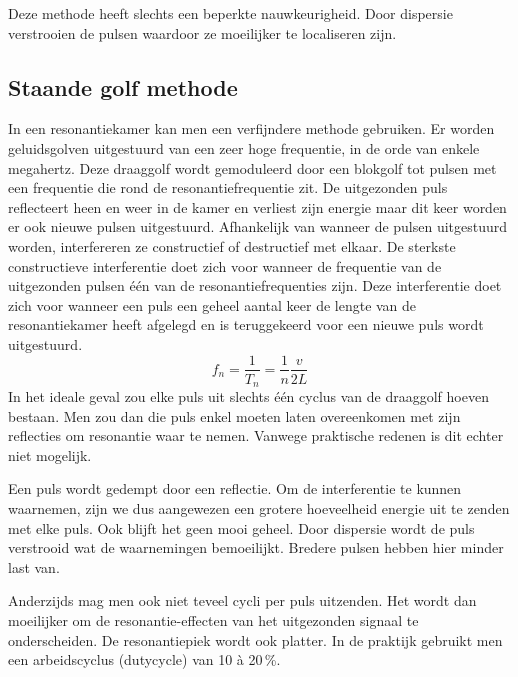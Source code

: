 
Deze methode heeft slechts een beperkte nauwkeurigheid. Door dispersie 
verstrooien de pulsen waardoor ze moeilijker te localiseren zijn.

\subsection{Staande golf methode}

In een resonantiekamer kan men een verfijndere methode gebruiken. Er worden 
geluidsgolven uitgestuurd van een zeer hoge frequentie, in de orde van enkele 
megahertz. Deze draaggolf wordt gemoduleerd door een blokgolf tot pulsen met 
een frequentie die rond de resonantiefrequentie zit. De uitgezonden puls 
reflecteert heen en weer in de kamer en verliest zijn energie maar dit keer 
worden er ook nieuwe pulsen uitgestuurd. Afhankelijk van wanneer de pulsen 
uitgestuurd worden, interfereren ze constructief of destructief met elkaar. De 
sterkste constructieve interferentie doet zich voor wanneer de frequentie van 
de uitgezonden pulsen \'e\'en van de resonantiefrequenties zijn. Deze 
interferentie doet zich voor wanneer een puls een geheel aantal keer de lengte 
van de resonantiekamer heeft afgelegd en is teruggekeerd voor een nieuwe puls 
wordt uitgestuurd.
\begin{equation}
\label{resfreq}
f_n = \frac{1}{T_n} = \frac{1}{n} \frac{v}{2L}
\end{equation}
In het ideale geval zou elke puls uit slechts \'e\'en cyclus van de draaggolf 
hoeven bestaan. Men zou dan die puls enkel moeten laten overeenkomen met zijn 
reflecties om resonantie waar te nemen. Vanwege praktische redenen is dit 
echter niet mogelijk.

Een puls wordt gedempt door een reflectie. Om de interferentie te kunnen 
waarnemen, zijn we dus aangewezen een grotere hoeveelheid energie uit te zenden 
met elke puls. Ook blijft het geen mooi geheel. Door dispersie wordt de puls 
verstrooid wat de waarnemingen bemoeilijkt. Bredere pulsen hebben hier minder 
last van.


Anderzijds mag men ook niet teveel cycli per puls uitzenden. Het wordt dan 
moeilijker om de resonantie-effecten van het uitgezonden signaal te 
onderscheiden. De resonantiepiek wordt ook platter. In de praktijk gebruikt men 
een arbeidscyclus (dutycycle) van 10 \`a 20\,\%.  




